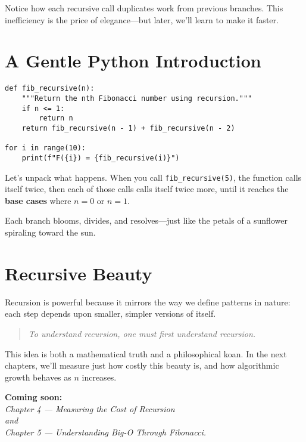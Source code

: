 Notice how each recursive call duplicates work from previous branches.  
This inefficiency is the price of elegance—but later, we’ll learn to make it faster.

\section{A Gentle Python Introduction}

\begin{verbatim}
def fib_recursive(n):
    """Return the nth Fibonacci number using recursion."""
    if n <= 1:
        return n
    return fib_recursive(n - 1) + fib_recursive(n - 2)

for i in range(10):
    print(f"F({i}) = {fib_recursive(i)}")
\end{verbatim}

Let’s unpack what happens.  
When you call \texttt{fib\_recursive(5)}, the function calls itself twice,  
then each of those calls calls itself twice more,  
until it reaches the \textbf{base cases} where $n = 0$ or $n = 1$.

Each branch blooms, divides, and resolves—just like the petals of a sunflower spiraling toward the sun.

\section{Recursive Beauty}
Recursion is powerful because it mirrors the way we define patterns in nature:  
each step depends upon smaller, simpler versions of itself.

\begin{quote}
\textit{To understand recursion, one must first understand recursion.}
\end{quote}

This idea is both a mathematical truth and a philosophical koan.  
In the next chapters, we’ll measure just how costly this beauty is,  
and how algorithmic growth behaves as $n$ increases.

\begin{center}
\textbf{Coming soon:}\\
\textit{Chapter 4 — Measuring the Cost of Recursion}\\
\textit{and}\\
\textit{Chapter 5 — Understanding Big-O Through Fibonacci.}
\end{center}

